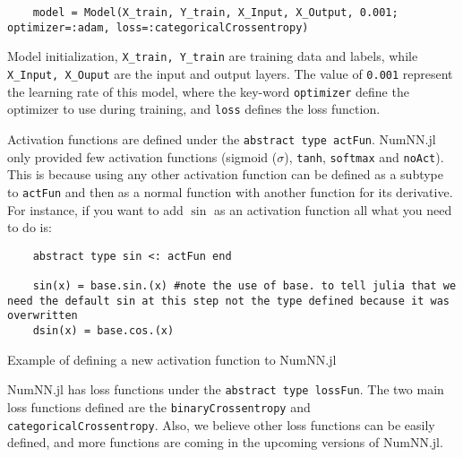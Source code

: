 \begin{listing}[H]
	\begin{verbatim}
	model = Model(X_train, Y_train, X_Input, X_Output, 0.001; optimizer=:adam, loss=:categoricalCrossentropy)
	\end{verbatim}
	\caption{Model initialization, \texttt{X_train, Y_train} are training data and labels, while \texttt{X_Input, X_Ouput} are the input and output layers. The value of \texttt{0.001} represent the learning rate of this model, where the key-word \texttt{optimizer} define the optimizer to use during training, and \texttt{loss} defines the loss function.}\label{modelinit}
\end{listing}

Activation functions are defined under the \texttt{abstract type actFun}. NumNN.jl only provided few activation functions (sigmoid ($\sigma$), \texttt{tanh}, \texttt{softmax} and \texttt{noAct}). This is because using any other activation function can be defined as a subtype to \texttt{actFun} and then as a normal function with another function for its derivative. For instance, if you want to add $\sin$ as an activation function all what you need to do is:

\begin{listing}[H]
	\begin{verbatim}
	abstract type sin <: actFun end
	
	sin(x) = base.sin.(x) #note the use of base. to tell julia that we need the default sin at this step not the type defined because it was overwritten
	dsin(x) = base.cos.(x)
	\end{verbatim}
	\caption{Example of defining a new activation function to NumNN.jl}
\end{listing}

NumNN.jl has loss functions under the \texttt{abstract type lossFun}. The two main loss functions defined are the \texttt{binaryCrossentropy} and \texttt{categoricalCrossentropy}. Also, we believe other loss functions can be easily defined, and more functions are coming in the upcoming versions of NumNN.jl.



